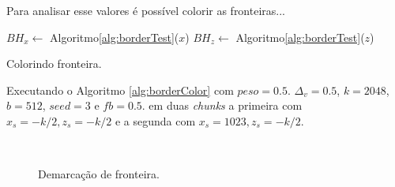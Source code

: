 Para analisar esse valores é possível colorir as fronteiras...

\begin{algorithm}[H]\label{alg:borderColor}%
    $BH_{x} \leftarrow$ Algoritmo\ref{alg:borderTest}($x$)\;
    $BH_{z} \leftarrow$ Algoritmo\ref{alg:borderTest}($z$)\;
    
    
    \caption{Colorindo fronteira.}
\end{algorithm}

Executando o Algoritmo \ref{alg:borderColor} com $peso = 0.5$. $\Delta_{v} = 0.5$, 
$k = 2048$, $b = 512$, $seed = 3$ e $fb = 0.5$. em duas \textit{chunks} a primeira com $ x_{s} = -k/2 , z_{s} = -k/2$
e a segunda com $ x_{s} = 1023 , z_{s} = -k/2$.

\begin{figure}[H]
     \centering
     \hspace{0.1cm}
     \\
     \caption{Demarcação de fronteira.}
     
     \label{fig:borderlenanotherauxyeah}
\end{figure}

